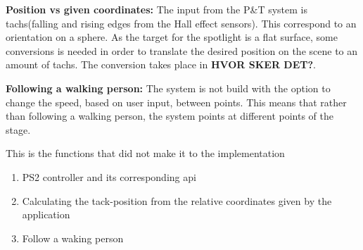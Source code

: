 \textbf{Position vs given coordinates:} The input from the P\&T system is tachs(falling and rising edges from the Hall effect sensors). This correspond to an orientation on a sphere. As the target for the spotlight is a flat surface, some conversions is needed in order to translate the desired position on the scene to an amount of tachs. The conversion takes place in \textbf{HVOR SKER DET?}.


\textbf{Following a walking person:} The system is not build with the option to change the speed, based on user input, between points. This means that rather than following a walking person, the system points at different points of the stage.


This is the functions that did not make it to the implementation

\begin{enumerate}[noitemsep]
	
	\item PS2 controller and its corresponding api
	
	\item Calculating the tack-position from the relative coordinates given by the application  
	
	\item Follow a waking person
	

\end{enumerate}